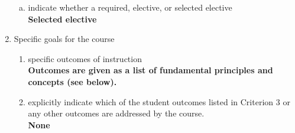 \begin{enumerate}[1.]
\begin{enumerate}[a.]
\item indicate whether a required, elective, or selected elective\\ %
  {\bfseries
    Selected elective
  }

\end{enumerate}

\item Specific goals for the course
\begin{enumerate}
\item specific outcomes of instruction\\ %
  {\bfseries
    Outcomes are given as a list of fundamental principles and concepts (see below).
  }

\item explicitly indicate which of the student outcomes listed in Criterion 3 or any other outcomes are addressed by the course.\\
  {\bfseries
    None
  }
\end{enumerate}


\end{enumerate}
